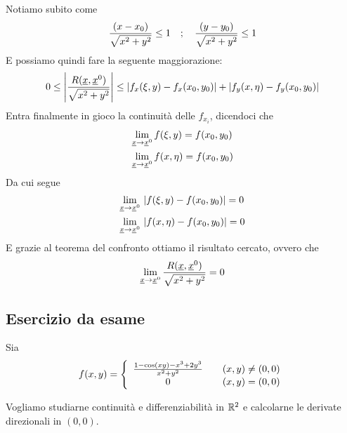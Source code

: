 Notiamo subito come
\begin{align}
\frac{(x-x_0)}{\sqrt{x^2 + y^2}} \leq 1 \quad ; \quad \frac{(y-y_0)}{\sqrt{x^2 + y^2}} \leq 1
\end{align}
E possiamo quindi fare la seguente maggiorazione:
\begin{align}
0\leq \left| \frac{R(\underline{x}, \underline{x}^0)}{\sqrt{x^2 + y^2}} \right| \leq \left| f_x(\xi,y) - f_x(x_0,y_0) \right| + \left| f_y(x,\eta) - f_y(x_0,y_0) \right|
\end{align}
Entra finalmente in gioco la continuità delle $f_{x_i}$, dicendoci che 
\begin{align}
{}& \underset{\underline{x} \rightarrow \underline{x}^0}{\lim} \, f(\xi,y)=f(x_0,y_0) \\
& \underset{\underline{x} \rightarrow \underline{x}^0}{\lim} \, f(x,\eta)=f(x_0,y_0)
\end{align}
Da cui segue 
\begin{align}
{}& \underset{\underline{x} \rightarrow \underline{x}^0}{\lim} \, \left| f(\xi,y)-f(x_0,y_0) \right|=0 \\
& \underset{\underline{x} \rightarrow \underline{x}^0}{\lim} \, \left| f(x,\eta)-f(x_0,y_0) \right|=0
\end{align}
E grazie al teorema del confronto ottiamo il risultato cercato, ovvero che
\begin{align}
\underset{\underline{x} \rightarrow \underline{x}^0}{\lim} \, \frac{R(\underline{x}, \underline{x}^0)}{\sqrt{x^2 + y^2}} = 0
\end{align}

\newpage

\subsection{Esercizio da esame}

Sia
\begin{align}
	f(x,y)=\left\{\begin{array}{cc}  \frac{1 - \cos(xy) - x^3 + 2y^3}{x^2 + y^2} \quad {}&(x,y) \neq(0,0) \\ 0 \quad &(x,y)=(0,0) \end{array}\right.
\end{align}

Vogliamo studiarne continuità e differenziabilità in $\mathbb{R}^2$ e calcolarne le derivate direzionali in $(0,0)$.

